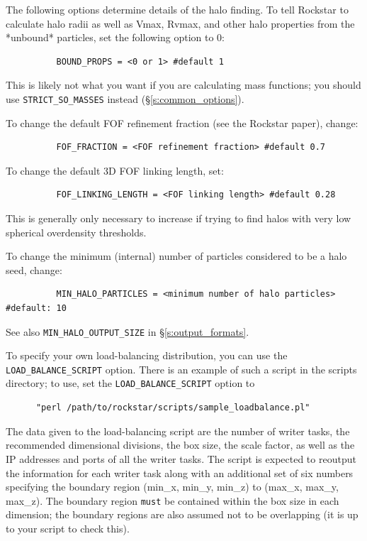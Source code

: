 \documentclass[12pt]{article}
\begin{document}
      The following options determine details of the halo finding.  To tell
      Rockstar to calculate halo radii as well as Vmax, Rvmax, and other
      halo properties from the *unbound* particles, set the following option
      to 0:
\begin{verbatim}
          BOUND_PROPS = <0 or 1> #default 1
\end{verbatim}
	This is likely not what you want if you are calculating mass functions; you should use \texttt{STRICT\_SO\_MASSES} instead (\S \ref{s:common_options}).

      To change the default FOF refinement fraction (see the Rockstar paper),
      change:
\begin{verbatim}
          FOF_FRACTION = <FOF refinement fraction> #default 0.7
\end{verbatim}
      To change the default 3D FOF linking length, set:
\begin{verbatim}
          FOF_LINKING_LENGTH = <FOF linking length> #default 0.28
\end{verbatim}
	This is generally only necessary to increase if trying to find halos with very low spherical overdensity thresholds.

      To change the minimum (internal) number of particles considered to be
      a halo seed, change:
\begin{verbatim}
          MIN_HALO_PARTICLES = <minimum number of halo particles> #default: 10
\end{verbatim}

      See also \texttt{MIN\_HALO\_OUTPUT\_SIZE} in \S \ref{s:output_formats}.


      To specify your own load-balancing distribution, you can use the
      \texttt{LOAD\_BALANCE\_SCRIPT} option.  There is an example of such a script in
      the scripts directory; to use, set the \texttt{LOAD\_BALANCE\_SCRIPT} option to
      \begin{verbatim}
      "perl /path/to/rockstar/scripts/sample_loadbalance.pl"
      \end{verbatim}
      The data given to the load-balancing script are the number of writer tasks,
      the recommended dimensional divisions,
      the box size, the scale factor, as well as the IP addresses and ports
      of all the writer tasks.  The script is expected to reoutput the
      information for each writer task along with an additional set of six
      numbers specifying the boundary region (min\_x, min\_y, min\_z) to
      (max\_x, max\_y, max\_z).  The boundary region \texttt{must} be contained within
      the box size in each dimension; the boundary regions are also assumed not to
      be overlapping (it is up to your script to check this).
\end{document}
